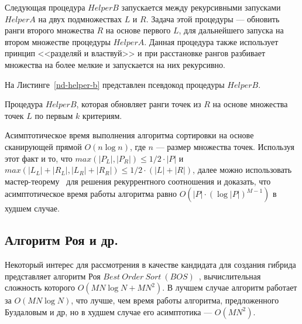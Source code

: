 Следующая процедура $HelperB$ запускается между рекурсивными запусками $HelperA$ на двух подмножествах $L$ и $R$. Задача этой процедуры {---} обновить ранги второго множества $R$ на основе первого $L$, для дальнейшего запуска на втором множестве процедуры $HelperA$. Данная процедура также использует принцип <<разделяй и властвуй>> и при расстановке рангов разбивает множества на более мелкие и запускается на них рекурсивно.

На Листинге~\ref{nd-helper-b} представлен псевдокод процедуры $HelperB$.

\begin{algorithm}
\begin{algorithmic}[1]
     \Return
    \EndIf
\EndProcedure
\end{algorithmic}
\caption{Процедура \textsc{$HelperB$}, которая обновляет ранги точек из $R$ на основе множества точек $L$ по первым $k$ критериям.}
\label{nd-helper-b}
\end{algorithm}

Асимптотическое время выполнения алгоритма сортировки на основе сканирующей прямой $O(n \log n)$, где $n$ {---} размер множества точек. Используя этот факт и то, что $max(|P_L|, |P_R|) \le 1/2 \cdot |P|$ и $max(|L_L| + |R_L|, |L_R| + |R_R|) \le 1/2 \cdot(|L| + |R|)$, далее можно использовать мастер-теорему~\cite{Cormen} для решения рекуррентного соотношения и доказать, что асимптотическое время работы алгоритма равно $O(|P| \cdot (\log|P|)^{M-1})$ в худшем случае.

\subsection{Алгоритм Роя и др.}

Некоторый интерес для рассмотрения в качестве кандидата для создания гибрида представляет алгоритм Роя $Best~Order~Sort~(BOS)$~\cite{Roy}, вычислительная сложность которого $O(MN \log N+MN^2)$. В лучшем случае алгоритм работает за $O(MN \log N)$, что лучше, чем время работы алгоритма, предложенного Буздаловым и др, но в худшем случае его асимптотика {---} $O(MN^2)$. 

